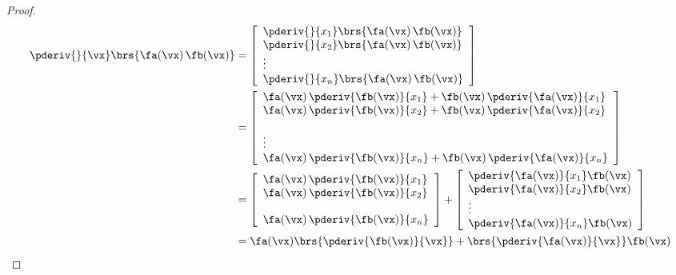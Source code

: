 \begin{lemma}
\label{lem:mc_ab}
\end{lemma}
\begin{proof}
\begin{align*}
  \pderiv{}{\vx} \brs{\fa(\vx)\,\fb(\vx)} 
    &= \left[\begin{array}{l}
         \pderiv{}{x_1}\brs{\fa(\vx)\,\fb(\vx)}   \\
         \pderiv{}{x_2}\brs{\fa(\vx)\,\fb(\vx)}   \\
         \vdots                                   \\
         \pderiv{}{x_n}\brs{\fa(\vx)\,\fb(\vx)}  
       \end{array}\right]
  \\&= \left[\begin{array}{l}
         \fa(\vx)\,\pderiv{\fb(\vx)}{x_1} + \fb(\vx)\,\pderiv{\fa(\vx)}{x_1}     \\
         \fa(\vx)\,\pderiv{\fb(\vx)}{x_2} + \fb(\vx)\,\pderiv{\fa(\vx)}{x_2}     \\
         \\ \vdots                                \\                              
         \fa(\vx)\,\pderiv{\fb(\vx)}{x_n} + \fb(\vx)\,\pderiv{\fa(\vx)}{x_n}     
       \end{array}\right]
  \\&= \left[\begin{array}{l}
         \fa(\vx)\,\pderiv{\fb(\vx)}{x_1}  \\
         \fa(\vx)\,\pderiv{\fb(\vx)}{x_2}  \\
         \\                          
         \fa(\vx)\,\pderiv{\fb(\vx)}{x_n}  
       \end{array}\right]
     + \left[\begin{array}{l}
         \pderiv{\fa(\vx)}{x_1} \fb(\vx) \\
         \pderiv{\fa(\vx)}{x_2} \fb(\vx) \\
         \vdots                          \\
         \pderiv{\fa(\vx)}{x_n} \fb(\vx)
       \end{array}\right]
  \\&= \fa(\vx)\brs{\pderiv{\fb(\vx)}{\vx}} + \brs{\pderiv{\fa(\vx)}{\vx}}\fb(\vx)
\end{align*}
\end{proof}



